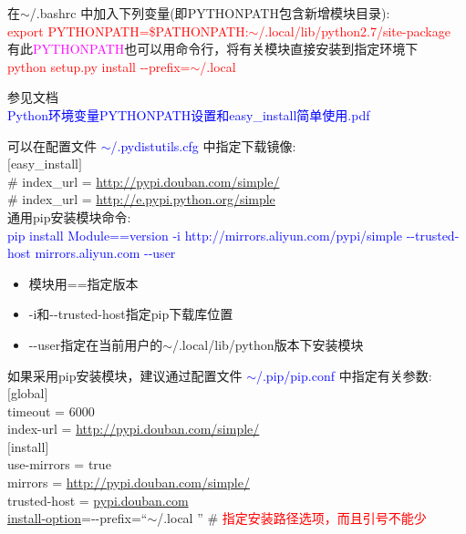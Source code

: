 \documentclass[10pt,a4paper]{article}
\begin{document}
在$\sim$/.bashrc 中加入下列变量(即\textrm{PYTHONPATH}包含新增模块目录):\\
\textcolor{red}{export PYTHONPATH=\$PATHONPATH:$\sim$/.local/lib/python2.7/site-package}\\

有此\textcolor{magenta}{PYTHONPATH}也可以用命令行，将有关模块直接安装到指定环境下\\
\textcolor{red}{python setup.py install -\/-prefix=$\sim$/.local}

参见文档\\
\textcolor{blue}{\textrm{Python}环境变量\textrm{PYTHONPATH}设置和\textrm{easy\_install}简单使用.pdf}

可以在配置文件 \textcolor{blue}{$\sim$/.pydistutils.cfg} 中指定下载镜像:\\
$[$easy\_install$]$\\
\# index\_url = \url{http://pypi.douban.com/simple/} \\
\# index\_url = \url{http://e.pypi.python.org/simple} \\

通用\textrm{pip}安装模块命令:\\
\textcolor{blue}{\textrm{pip install Module==version -i http://mirrors.aliyun.com/pypi/simple -\/-trusted-host mirrors.aliyun.com -\/-user}}\\
\begin{itemize}
	\item 模块用\textrm{==}指定版本
	\item \textrm{-i}和\textrm{-\/-trusted-host}指定\textrm{pip}下载库位置
	\item \textrm{-\/-}user指定在当前用户的{$\sim$/.local/lib/python}版本下安装模块
\end{itemize}

如果采用\textrm{pip}安装模块，建议通过配置文件 \textcolor{blue}{$\sim$/.pip/pip.conf} 中指定有关参数:\\
$[$global$]$\\
timeout = 6000\\
index-url = \url{http://pypi.douban.com/simple/} \\
$[$install$]$\\
use-mirrors = true\\
mirrors = \url{http://pypi.douban.com/simple/} \\
trusted-host = \url{pypi.douban.com} \\
\underline{install-option}=-\/-prefix=``$\sim$/.local '' \# \textcolor{red}{指定安装路径选项，而且引号不能少} \\
\end{document}
